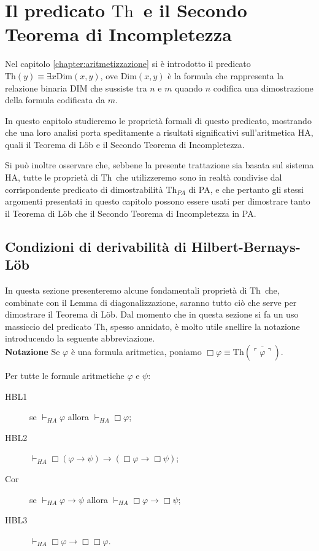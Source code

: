 
\chapter{Il predicato \ensuremath{\mathrm{Th}}\ e il Secondo Teorema di Incompletezza}

\noindent Nel capitolo \ref{chapter:aritmetizzazione} si è introdotto il predicato $\ensuremath{\mathrm{Th}}(y)\equiv\exists x\ensuremath{\mathrm{Dim}}(x,y)$, ove $\ensuremath{\mathrm{Dim}}(x,y)$ è la formula che rappresenta la relazione binaria $\ensuremath{\mathrm{DIM}}$ che sussiste tra $n$ e $m$ quando $n$ codifica una dimostrazione della formula codificata da $m$.

In questo capitolo studieremo le proprietà formali di questo predicato, mostrando che una loro analisi porta speditamente a risultati significativi sull'aritmetica HA, quali il Teorema di L\"ob e il Secondo Teorema di Incompletezza.

Si può inoltre osservare che, sebbene la presente trattazione sia basata sul sistema HA, tutte le proprietà di \ensuremath{\mathrm{Th}}\ che utilizzeremo sono in realtà condivise dal corrispondente predicato di dimostrabilità $\ensuremath{\mathrm{Th}}_{PA}$ di PA, e che pertanto gli stessi argomenti presentati in questo capitolo possono essere usati per dimostrare tanto il Teorema di L\"ob che il Secondo Teorema di Incompletezza in PA.\\
\bigskip

\section{Condizioni di derivabilità di Hilbert-Bernays-L\"ob}

\noindent In questa sezione presenteremo alcune fondamentali proprietà di \ensuremath{\mathrm{Th}}\ che, combinate con il Lemma di diagonalizzazione, saranno tutto ciò che serve per dimostrare il Teorema di L\"ob. Dal momento che in questa sezione si fa un uso massiccio del predicato $\ensuremath{\mathrm{Th}}$, spesso annidato, è molto utile snellire la notazione introducendo la seguente abbreviazione.\\

\noindent \textbf{Notazione} Se $\varphi$ è una formula aritmetica, poniamo $\Box\varphi\equiv\ensuremath{\mathrm{Th}}(\overline{\ulcorner\varphi\urcorner})$.

\begin{thm} Per tutte le formule aritmetiche $\varphi$ e $\psi$:
\begin{description}
\item[HBL1] se $\vdash_{HA}\varphi$ allora $\vdash_{HA}\Box\varphi$;
\item[HBL2] $\vdash_{HA}\Box(\varphi\to\psi)\to(\Box\varphi\to\Box\psi)$;
\item[Cor] se $\vdash_{HA}\varphi\to\psi$ allora $\vdash_{HA}\Box\varphi\to\Box\psi$;
\item[HBL3] $\vdash_{HA}\Box\varphi\to\Box\Box\varphi$.
\end{description}
\end{thm}

